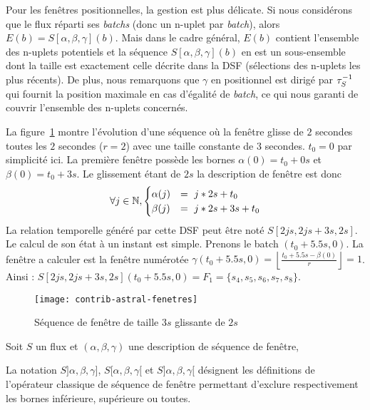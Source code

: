 Pour les fenêtres positionnelles, la gestion est plus délicate. Si nous considérons que le flux réparti ses \textit{batchs} (donc un n-uplet par \textit{batch}), alors $E(b) = S[\alpha,\beta,\gamma](b)$. Mais dans le cadre général, $E(b)$ contient l'ensemble des n-uplets potentiels et la séquence $S[\alpha,\beta,\gamma](b)$ en est un sous-ensemble dont la taille est exactement celle décrite dans la DSF (sélections des n-uplets les plus récents). De plus, nous remarquons que $\gamma$ en positionnel est dirigé par $\tau^{-1}_S$ qui fournit la position maximale en cas d'égalité de \textit{batch}, ce qui nous garanti de couvrir l'ensemble des n-uplets concernés.

	
\begin{example}
	La figure~\ref{fig:contrib:astral:fenetres} montre l'évolution d'une séquence où la fenêtre glisse de $2$ secondes toutes les $2$ secondes ($r=2$) avec une taille constante de $3$ secondes. $t_0 = 0$ par simplicité ici. 
La première fenêtre possède les bornes $\alpha(0) = t_0+ 0s$ et $\beta(0) =t_0+3s$. Le glissement étant de $2s$ la description de fenêtre est donc $$\forall j \in \mathbb{N}, \begin{cases} \alpha(j)  & =\ j*2s+t_0 \\ \beta(j) & = \ j*2s+3s+t_0\end{cases}$$
La relation temporelle généré par cette DSF peut être noté $S[2js,2js+3s,2s]$.  Le calcul de son état à un instant est simple. Prenons le batch $(t_0+5.5s,0)$. La fenêtre a calculer est la fenêtre numérotée $\gamma(t_0+5.5s,0) = \left\lfloor \frac{t_0+5.5s-\beta(0)}{r}\right\rfloor = 1$. Ainsi : $S[2js,2js+3s,2s](t_0+5.5s,0) = F_1 = \{s_4,s_5,s_6,s_7,s_8\}$.
\end{example}
\begin{figure}[ht]
	\centering
	\texttt{[image: contrib-astral-fenetres]}
	\caption{Séquence de fenêtre de taille $3s$ glissante de $2s$}\label{fig:contrib:astral:fenetres}
\end{figure}

\begin{defi}
    Soit $S$ un flux et $(\alpha,\beta,\gamma)$ une description de séquence de fenêtre,

    La notation $S]\alpha,\beta,\gamma]$, $S[\alpha,\beta,\gamma[$ et $S]\alpha,\beta,\gamma[$ désignent les définitions de l'opérateur classique de séquence de fenêtre permettant d'exclure respectivement les bornes inférieure, supérieure ou toutes.
\end{defi}

